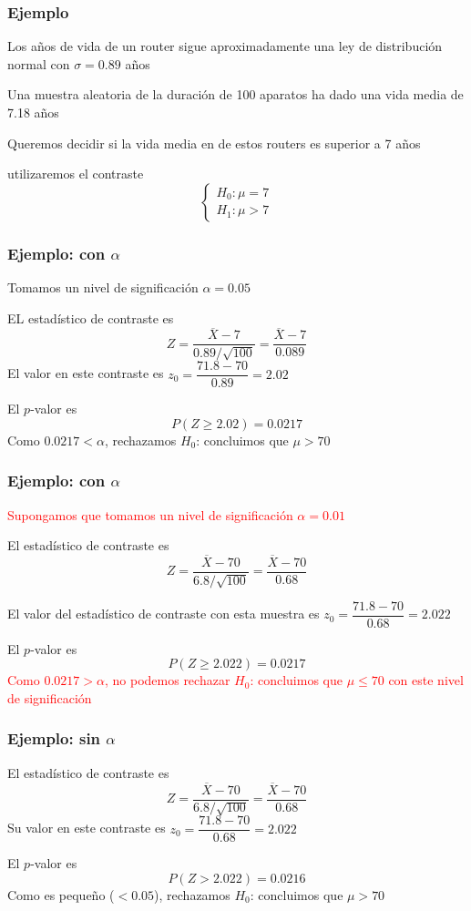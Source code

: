 \documentclass[12pt,t]{beamer}\usepackage[]{graphicx}\usepackage[]{color}
\newcommand{\red}[1]{\textcolor{red}{#1}}
\renewcommand{\leq}{\leqslant}
\renewcommand{\geq}{\geqslant}
\theoremstyle{plain}
\theoremstyle{definition}
\begin{document}
\begin{frame}
\frametitle{Ejemplo}

Los años de vida de un  router sigue  aproximadamente una ley de distribución normal con $\sigma=0.89$ años
\medskip

Una muestra aleatoria de la duración de 100 aparatos ha dado una vida media de 7.18 años
\medskip

Queremos decidir si la vida media en de estos routers es superior a  7 años
\medskip

utilizaremos el contraste
$$
\left\{\begin{array}{l}
H_{0}:\mu=7\\ 
H_{1}:\mu>7
\end{array}
\right.
$$
\end{frame}

\begin{frame}
\frametitle{Ejemplo: con $\alpha$}

Tomamos  un nivel   de significación   $\alpha=0.05$
\medskip

EL estadístico  de contraste    es 
$$
Z=\frac{\overline{X}-7}{0.89/\sqrt{100}}=\frac{\overline{X}-7}{0.089}
$$
El valor en este contraste  es $z_0\!=\!\dfrac{71.8-70}{0.89}\!=\!2.02$
\medskip

El $p$-valor es 
$$
P(Z\geq 2.02)=0.0217
$$
Como  $0.0217<\alpha$, rechazamos $H_0$: concluimos que $\mu>70$

\end{frame}


\begin{frame}
\frametitle{Ejemplo: con $\alpha$}

\red{Supongamos  que tomamos  un nivel  de significación   $\alpha=0.01$}
\medskip

El estadístico  de contraste    es 
$$
Z=\frac{\overline{X}-70}{6.8/\sqrt{100}}=\frac{\overline{X}-70}{0.68}
$$

El valor del estadístico de contraste con esta muestra es $z_0\!=\!\dfrac{71.8-70}{0.68}\!=\!2.022$
\medskip

El $p$-valor es 
$$
P(Z\geq 2.022)=0.0217
$$
\red{Como $0.0217>\alpha$, no podemos rechazar   $H_0$: concluimos que $\mu\leq 70$ con este nivel de significación}

\end{frame}




\begin{frame}
\frametitle{Ejemplo: sin $\alpha$}

El estadístico  de contraste    es 
$$
Z=\frac{\overline{X}-70}{6.8/\sqrt{100}}=\frac{\overline{X}-70}{0.68}
$$
Su valor en este contraste es $z_0\!=\!\dfrac{71.8-70}{0.68}\!=\!2.022$

\medskip

El $p$-valor es 
$$
P(Z> 2.022)=0.0216
$$
Como es pequeño ($<0.05$), rechazamos $H_0$: concluimos que $\mu>70$

\end{frame}
\end{document}
